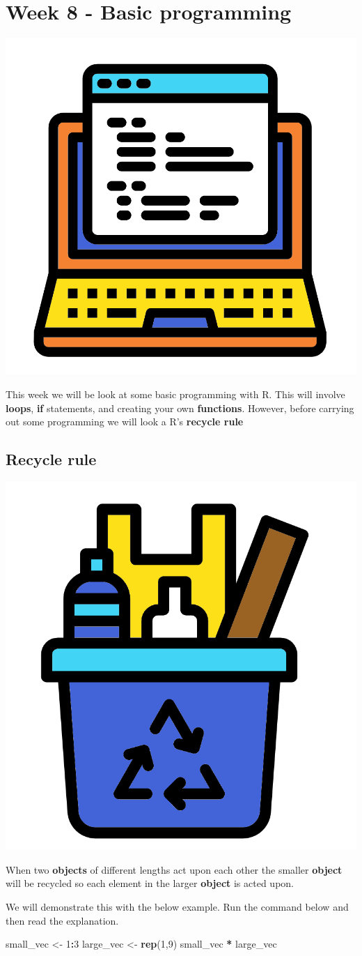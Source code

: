 \documentclass[]{book}
\newenvironment{Shaded}{\begin{snugshade}}{\end{snugshade}}
\newcommand{\KeywordTok}[1]{\textcolor[rgb]{0.13,0.29,0.53}{\textbf{#1}}}
\newcommand{\DecValTok}[1]{\textcolor[rgb]{0.00,0.00,0.81}{#1}}
\newcommand{\StringTok}[1]{\textcolor[rgb]{0.31,0.60,0.02}{#1}}
\newcommand{\OperatorTok}[1]{\textcolor[rgb]{0.81,0.36,0.00}{\textbf{#1}}}
\newcommand{\NormalTok}[1]{#1}
\begin{document}
\chapter{Week 8 - Basic programming}\label{week-8---basic-programming}

\begin{center}\includegraphics[width=0.2\linewidth]{figures/programming} \end{center}

This week we will be look at some basic programming with R. This will
involve \textbf{loops}, \textbf{if} statements, and creating your own
\textbf{functions}. However, before carrying out some programming we
will look a R's \textbf{recycle rule}

\section{Recycle rule}\label{recycle-rule}

\begin{center}\includegraphics[width=0.2\linewidth]{figures/recycle} \end{center}

When two \textbf{objects} of different lengths act upon each other the
smaller \textbf{object} will be recycled so each element in the larger
\textbf{object} is acted upon.

We will demonstrate this with the below example. Run the command below
and then read the explanation.

\begin{Shaded}
\begin{Highlighting}[]
\NormalTok{small_vec <-}\StringTok{ }\DecValTok{1}\OperatorTok{:}\DecValTok{3}
\NormalTok{large_vec <-}\StringTok{ }\KeywordTok{rep}\NormalTok{(}\DecValTok{1}\NormalTok{,}\DecValTok{9}\NormalTok{) }
\NormalTok{small_vec }\OperatorTok{*}\StringTok{ }\NormalTok{large_vec}
\end{Highlighting}
\end{Shaded}
\end{document}
